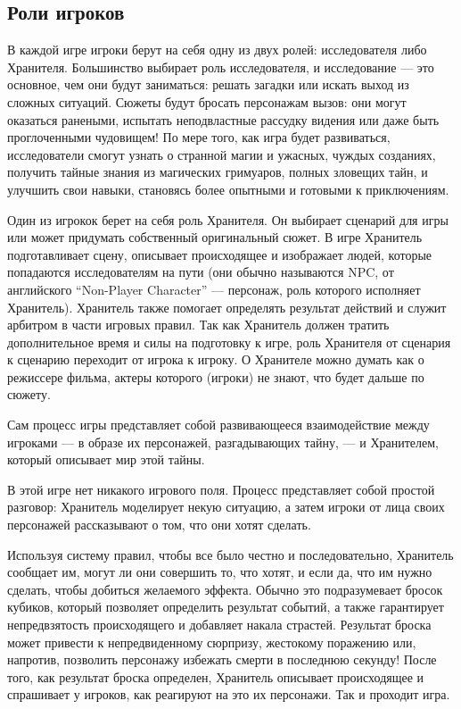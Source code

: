 \documentclass[letterpaper,twocolumn,openany, twoside, 11pt, usenames]{cocbook}
\begin{document}
\subsection*{\nohyphens{Роли игроков}}

В каждой игре игроки берут на себя одну из двух ролей: исследователя либо Хранителя. Большинство выбирает роль исследователя, и исследование --- это основное, чем они будут заниматься: решать загадки или искать выход из сложных ситуаций. Сюжеты будут бросать персонажам вызов: они могут оказаться ранеными, испытать неподвластные рассудку видения или даже быть проглоченными чудовищем! По мере того, как игра будет развиваться, исследователи смогут узнать о странной магии и ужасных, чуждых созданиях, получить тайные знания из магических гримуаров, полных зловещих тайн, и улучшить свои навыки, становясь более опытными и готовыми к приключениям.

Один из игрокок берет на себя роль Хранителя. Он выбирает сценарий для игры или может придумать собственный оригинальный сюжет. В игре Хранитель подготавливает сцену, описывает происходящее и изображает людей, которые попадаются исследователям на пути (они обычно называются NPC, от английского ``Non-Player Character'' --- персонаж, роль которого исполняет Хранитель). Хранитель также помогает определять результат действий и служит арбитром в части игровых правил. Так как Хранитель должен тратить дополнительное время и силы на подготовку к игре, роль Хранителя от сценария к сценарию переходит от игрока к игроку. О Хранителе можно думать как о режиссере фильма, актеры которого (игроки) не знают, что будет дальше по сюжету.

Сам процесс игры представляет собой развивающееся взаимодействие между игроками --- в образе их персонажей, разгадывающих тайну, --- и Хранителем, который описывает мир этой тайны.

В этой игре нет никакого игрового поля. Процесс представляет собой простой разговор: Хранитель моделирует некую ситуацию, а затем игроки от лица своих персонажей рассказывают о том, что они хотят сделать.

Используя систему правил, чтобы все было честно и последовательно, Хранитель сообщает им, могут ли они совершить то, что хотят, и если да, что им нужно сделать, чтобы добиться желаемого эффекта. Обычно это подразумевает бросок кубиков, который позволяет определить результат событий, а также гарантирует непредвзятость происходящего и добавляет накала страстей. Результат броска может привести к непредвиденному сюрпризу, жестокому поражению или, напротив, позволить персонажу избежать смерти в последнюю секунду! После того, как результат броска определен, Хранитель описывает происходящее и спрашивает у игроков, как реагируют на это их персонажи. Так и проходит игра.
\end{document}
